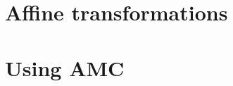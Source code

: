 \documentclass[a4paper,12pt]{article}
\begin{document}
\section{Affine transformations}
\label{sec:affine}

\section{Using AMC}
\label{sec:use}
\end{document}

